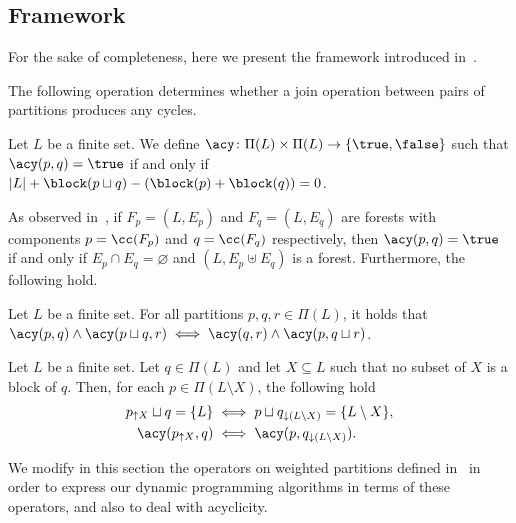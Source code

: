 \begin{toappendix}

\section{Framework}\label{sec:acyclic:cw:framework}

For the sake of completeness, here we present the framework introduced in~\cite[Section~3]{tcs/BergougnouxK19}.

The following operation determines whether a join operation between pairs of partitions produces any cycles.

\begin{definition}
    Let $L$ be a finite set.
    We define $\acy \colon \Pi(L) \times \Pi(L) \to \{\true,\false\}$
    such that $\acy(p,q) = \true$ if and only if
    $|L| + \block(p \sqcup q) - (\block(p)+\block(q))=0$.
\end{definition}

As observed in~\cite{tcs/BergougnouxK19}, if $F_p=(L,E_p)$ and $F_q=(L,E_q)$ are forests with components
$p=\cc(F_p)$ and $q=\cc(F_q)$ respectively,
then $\acy(p,q) = \true$ if and only if $E_p \cap E_q = \varnothing$ and $(L,E_p \uplus E_q)$ is a forest.
Furthermore, the following hold.

\begin{lemma}\label{fact:par-rep2}
    Let $L$ be a finite set.
    For all partitions $p,q,r \in \Pi(L)$, it holds that
    $\acy(p,q) \land \acy(p \sqcup q,r) \iff
    \acy(q,r) \land \acy(p,q\sqcup r)$.
\end{lemma}


\begin{lemma}\label{fact:join}
    Let $L$ be a finite set.
    Let $q \in \Pi(L)$ and let $X \subseteq L$ such that no subset of $X$ is a block of $q$.
    Then, for each $p \in \Pi(L \setminus X)$,
    the following hold
    \begin{align}
        p_{\uparrow X} \sqcup q = \{L\} &\iff
        p \sqcup q_{\downarrow (L \setminus X)}
        = \{L \setminus X\},\\
        \acy(p_{\uparrow X},q)  &\iff \acy(p,q_{\downarrow (L \setminus X)}).
    \end{align}
\end{lemma}


We modify in this section the operators on weighted partitions defined in~\cite{iandc/BodlaenderCKN15} in order to express our
dynamic programming algorithms in terms of these operators, and also to deal with acyclicity.


\end{toappendix}
